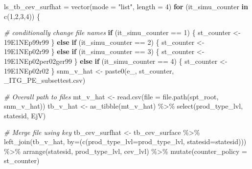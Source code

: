 \documentclass[
]{book}
\newenvironment{Shaded}{\begin{snugshade}}{\end{snugshade}}
\newcommand{\AttributeTok}[1]{\textcolor[rgb]{0.77,0.63,0.00}{#1}}
\newcommand{\CommentTok}[1]{\textcolor[rgb]{0.56,0.35,0.01}{\textit{#1}}}
\newcommand{\ControlFlowTok}[1]{\textcolor[rgb]{0.13,0.29,0.53}{\textbf{#1}}}
\newcommand{\DecValTok}[1]{\textcolor[rgb]{0.00,0.00,0.81}{#1}}
\newcommand{\FunctionTok}[1]{\textcolor[rgb]{0.00,0.00,0.00}{#1}}
\newcommand{\NormalTok}[1]{#1}
\newcommand{\OtherTok}[1]{\textcolor[rgb]{0.56,0.35,0.01}{#1}}
\newcommand{\SpecialCharTok}[1]{\textcolor[rgb]{0.00,0.00,0.00}{#1}}
\newcommand{\StringTok}[1]{\textcolor[rgb]{0.31,0.60,0.02}{#1}}
\begin{document}
\begin{Shaded}
\begin{Highlighting}[]
\NormalTok{ls\_tb\_cev\_surfhat }\OtherTok{=} \FunctionTok{vector}\NormalTok{(}\AttributeTok{mode =} \StringTok{"list"}\NormalTok{, }\AttributeTok{length =} \DecValTok{4}\NormalTok{)}
\ControlFlowTok{for}\NormalTok{ (it\_simu\_counter }\ControlFlowTok{in} \FunctionTok{c}\NormalTok{(}\DecValTok{1}\NormalTok{,}\DecValTok{2}\NormalTok{,}\DecValTok{3}\NormalTok{,}\DecValTok{4}\NormalTok{)) \{}

    \CommentTok{\# conditionally change file names}
    \ControlFlowTok{if}\NormalTok{ (it\_simu\_counter }\SpecialCharTok{==} \DecValTok{1}\NormalTok{) \{}
\NormalTok{        st\_counter }\OtherTok{\textless{}{-}} \StringTok{\textquotesingle{}19E1NEp99r99\textquotesingle{}}
\NormalTok{    \} }\ControlFlowTok{else} \ControlFlowTok{if}\NormalTok{ (it\_simu\_counter }\SpecialCharTok{==} \DecValTok{2}\NormalTok{) \{}
\NormalTok{        st\_counter }\OtherTok{\textless{}{-}} \StringTok{\textquotesingle{}19E1NEp02r99\textquotesingle{}}
\NormalTok{    \} }\ControlFlowTok{else} \ControlFlowTok{if}\NormalTok{ (it\_simu\_counter }\SpecialCharTok{==} \DecValTok{3}\NormalTok{) \{}
\NormalTok{        st\_counter }\OtherTok{\textless{}{-}} \StringTok{\textquotesingle{}19E1NEp02per02ger99\textquotesingle{}}
\NormalTok{    \} }\ControlFlowTok{else} \ControlFlowTok{if}\NormalTok{ (it\_simu\_counter }\SpecialCharTok{==} \DecValTok{4}\NormalTok{) \{}
\NormalTok{        st\_counter }\OtherTok{\textless{}{-}} \StringTok{\textquotesingle{}19E1NEp02r02\textquotesingle{}}
\NormalTok{    \}}
\NormalTok{    snm\_v\_hat }\OtherTok{\textless{}{-}} \FunctionTok{paste0}\NormalTok{(}\StringTok{\textquotesingle{}e\_\textquotesingle{}}\NormalTok{, st\_counter, }\StringTok{\textquotesingle{}\_ITG\_PE\_subsettest.csv\textquotesingle{}}\NormalTok{)}
    
    \CommentTok{\# Overall path to files}
\NormalTok{    mt\_v\_hat }\OtherTok{\textless{}{-}} \FunctionTok{read.csv}\NormalTok{(}\AttributeTok{file =} \FunctionTok{file.path}\NormalTok{(spt\_root, snm\_v\_hat))}
\NormalTok{    tb\_v\_hat }\OtherTok{\textless{}{-}} \FunctionTok{as\_tibble}\NormalTok{(mt\_v\_hat) }\SpecialCharTok{\%\textgreater{}\%}
      \FunctionTok{select}\NormalTok{(prod\_type\_lvl, statesid, EjV)}
    
    \CommentTok{\# Merge file using key }
\NormalTok{    tb\_cev\_surfhat }\OtherTok{\textless{}{-}}\NormalTok{ tb\_cev\_surface }\SpecialCharTok{\%\textgreater{}\%}
      \FunctionTok{left\_join}\NormalTok{(tb\_v\_hat, }\AttributeTok{by=}\NormalTok{(}\FunctionTok{c}\NormalTok{(}\StringTok{\textquotesingle{}prod\_type\_lvl\textquotesingle{}}\OtherTok{=}\StringTok{\textquotesingle{}prod\_type\_lvl\textquotesingle{}}\NormalTok{, }
                                \StringTok{\textquotesingle{}statesid\textquotesingle{}}\OtherTok{=}\StringTok{\textquotesingle{}statesid\textquotesingle{}}\NormalTok{))) }\SpecialCharTok{\%\textgreater{}\%}
      \FunctionTok{arrange}\NormalTok{(statesid, prod\_type\_lvl, cev\_lvl) }\SpecialCharTok{\%\textgreater{}\%}
      \FunctionTok{mutate}\NormalTok{(}\AttributeTok{counter\_policy =}\NormalTok{ st\_counter)}
    

\end{Highlighting}
\end{Shaded}
\end{document}
